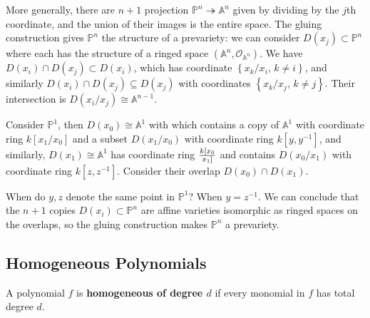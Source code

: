 \begin{remark}

More generally, there are \(n+1\) projection
\({\mathbb{P}}^n \twoheadrightarrow{\mathbb{A}}^n\) given by dividing by
the \(j\)th coordinate, and the union of their images is the entire
space. The gluing construction gives \({\mathbb{P}}^n\) the structure of
a prevariety: we can consider \(D(x_j) \subset {\mathbb{P}}^n\) where
each has the structure of a ringed space
\(({\mathbb{A}}^n, {\mathcal{O}}_{{\mathbb{A}}^n})\). We have
\(D(x_i) \cap D(x_j) \subset D(x_i)\), which has coordinate
\(\left\{{ x_k/x_i,\, k\neq i }\right\}\), and similarly
\(D(x_i) \cap D(x_j) \subseteq D(x_j)\) with coordinates
\(\left\{{ x_k/x_j, \, k\neq j}\right\}\). Their intersection is
\(D(x_i / x_j) \cong {\mathbb{A}}^{n-1}\).

\end{remark}

\begin{example}[?]

Consider \({\mathbb{P}}^1\), then \(D(x_0) \cong {\mathbb{A}}^1\) with
which contains a copy of \({\mathbb{A}}^1\) with coordinate ring
\(k[x_1 / x_0]\) and a subset \(D(x_1 / x_0)\) with coordinate ring
\(k[y, y^{-1}]\), and similarly, \(D(x_1) \cong {\mathbb{A}}^1\) has
coordinate ring \(k[x_0\over x_1]\) and contains \(D(x_0/ x_1)\) with
coordinate ring \(k[z, z^{-1}]\). Consider their overlap
\(D(x_0) \cap D(x_1)\). 

When do \(y, z\) denote the same point in \({\mathbb{P}}^1\)? When
\(y = z^{-1}\). We can conclude that the \(n+1\) copies
\(D(x_i) \subset {\mathbb{P}}^n\) are affine varieties isomorphic as
ringed spaces on the overlaps, so the gluing construction makes
\({\mathbb{P}}^n\) a prevariety.

\end{example}

\hypertarget{homogeneous-polynomials}{%
\subsection{Homogeneous Polynomials}\label{homogeneous-polynomials}}

\begin{definition}

A polynomial \(f\) is \textbf{homogeneous of degree \(d\)} if every
monomial in \(f\) has total degree \(d\).

\end{definition}

